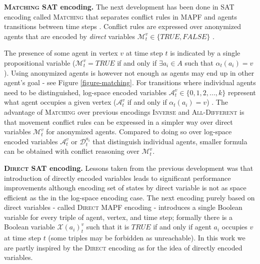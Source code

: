 \documentclass[jair,oneside,11pt]{article}
\begin{document}
\textbf{\textsc{Matching} SAT encoding.} The next development has been done in SAT encoding called \textsc{Matching} that separates conflict rules in MAPF and agents transitions between time steps \cite{DBLP:conf/ictai/Surynek14}. Conflict rules are expressed over anonymized agents that are encoded by {\em direct} variables $\mathcal{M}_t^v \in \{\mathit{TRUE}, \mathit{FALSE}\}$ \cite{DBLP:journals/constraints/TamuraTKB09}.

The presence of some agent in vertex $v$ at time step $t$ is indicated by a single propositional variable ($\mathcal{M}_t^v = \mathit{TRUE}$ if and only if $\exists a_i \in A$ such that $\alpha_t(a_i)=v$). Using anonymized agents is however not enough as agents may end up in other agent's goal - see Figure \ref{figure-matching}. For transitions where individual agents need to be distinguished, log-space encoded variables $\mathcal{A}_t^v \in \{0,1,2,...,k\}$ represent what agent occupies a given vertex ($\mathcal{A}_t^v$ if and only if $\alpha_t(a_i)=v$) \cite{DBLP:conf/ictai/Surynek14}. The advantage of \textsc{Matching} over previous encodings \textsc{Inverse} and \textsc{All-Different} is that movement conflict rules can be expressed in a simpler way over direct variables $\mathcal{M}_t^v$ for anonymized agents. Compared to doing so over log-space encoded variables $\mathcal{A}_t^{v}$ or $\mathcal{D}_t^{a_i}$ that distinguish individual agents, smaller formula can be obtained with conflict reasoning over $\mathcal{M}_t^v$.

{\bf \textsc{Direct} SAT encoding.} Lessons taken from the previous development was that introduction of directly encoded variables leads to significant performance improvements although encoding set of states by direct variable is not as space efficient as the in the log-space encoding case. The next encoding purely based on direct variables - called \textsc{Direct} MAPF encoding \cite{DBLP:conf/micai/Surynek14} - introduces a single Boolean variable for every triple of agent, vertex, and time step; formally there is a Boolean variable $\mathcal{X}(a_i)_t^v$ such that it is $\mathit{TRUE}$ if and only if agent $a_i$ occupies $v$ at time step $t$  (some triples may be forbidden as unreachable). In this work we are partly inspired by the \textsc{Direct} encoding as for the idea of directly encoded variables. 
\end{document}
